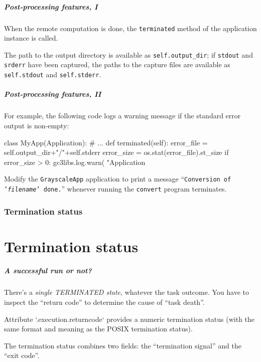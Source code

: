 \documentclass[english,serif,mathserif,xcolor=pdftex,dvipsnames,table]{beamer}
\begin{document}
\begin{frame}[fragile]
  \frametitle{Post-processing features, I}

  When the remote computation is done, the \texttt{terminated} method
  of the application instance is called.

  \+
  The path to the output directory is available as
  \lstinline|self.output_dir|; if \texttt{stdout} and \texttt{srderr}
  have been captured, the paths to the capture files are available as
  \lstinline|self.stdout| and \lstinline|self.stderr|.
\end{frame}


\begin{frame}[fragile]
  \frametitle{Post-processing features, II}

  For example, the following code logs a warning message if the
  standard error output is non-empty:
\begin{python}
class MyApp(Application):
  # ...
  def terminated(self):
    error_file = self.output_dir+"/"+self.stderr
    error_size = os.stat(error_file).st_size
    if error_size > 0:
      gc3libs.log.warn(
        "Application %
\end{python}
\end{frame}


\begin{frame}
  \begin{exercise*}[3.A]

    Modify the \texttt{GrayscaleApp} application to print a message
    ``\texttt{Conversion of '\emph{filename}' done.}'' whenever
    running the \texttt{convert} program terminates.
  \end{exercise*}
\end{frame}


\section{Termination status}
\part{Termination status}

\begin{frame}
  \frametitle{A successful run or not?}

  There's a \emph{single TERMINATED state}, whatever the task outcome.
  You have to inspect the ``return code'' to determine the
  cause of ``task death''.

  \+
  Attribute `.execution.returncode` provides a numeric termination
  status (with the same format and meaning as the POSIX termination
  status).

  \+
  The termination status combines two fields: the ``termination
  signal'' and the ``exit code''.

\end{frame}
\end{document}
